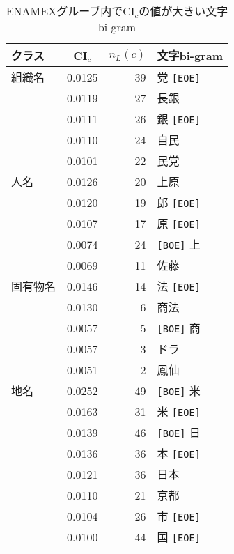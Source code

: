 \begin{table}[htbp]
\caption{\label{table:characters_with_CIc_bigram_enamex}ENAMEXグループ内でCI$_c$の値が大きい文字bi-gram}
\begin{center}
\begin{tabular}{|l|c|r|l|} \hline
クラス   & CI$_c$ & \(n_L(c)\) & 文字bi-gram \\ \hline \hline
組織名   & 0.0125 &   39 & 党 {\tt [EOE]}  \\ \cline{2-4} 
         & 0.0119 &   27 &            長銀 \\ \cline{2-4} 
         & 0.0111 &   26 & 銀 {\tt [EOE]}  \\ \cline{2-4} 
         & 0.0110 &   24 &            自民 \\ \cline{2-4} 
         & 0.0101 &   22 &            民党 \\ \hline \hline
人名     & 0.0126 &   20 &            上原 \\ \cline{2-4} 
         & 0.0120 &   19 & 郎 {\tt [EOE]}  \\ \cline{2-4} 
         & 0.0107 &   17 & 原 {\tt [EOE]}  \\ \cline{2-4} 
         & 0.0074 &   24 & {\tt [BOE]} 上  \\ \cline{2-4} 
         & 0.0069 &   11 &            佐藤 \\ \hline \hline
固有物名 & 0.0146 &   14 & 法 {\tt [EOE]}  \\ \cline{2-4} 
         & 0.0130 &    6 &            商法 \\ \cline{2-4} 
         & 0.0057 &    5 &  {\tt [BOE]} 商 \\ \cline{2-4} 
         & 0.0057 &    3 &            ドラ \\ \cline{2-4} 
         & 0.0051 &    2 &            鳳仙 \\ \hline \hline
地名     & 0.0252 &   49 &  {\tt [BOE]} 米 \\ \cline{2-4} 
         & 0.0163 &   31 & 米 {\tt [EOE]}  \\ \cline{2-4} 
         & 0.0139 &   46 &  {\tt [BOE]} 日 \\ \cline{2-4} 
         & 0.0136 &   36 & 本 {\tt [EOE]}  \\ \cline{2-4} 
         & 0.0121 &   36 &            日本 \\ \cline{2-4} 
         & 0.0110 &   21 &            京都 \\ \cline{2-4} 
         & 0.0104 &   26 & 市 {\tt [EOE]}  \\ \cline{2-4} 
         & 0.0100 &   44 & 国 {\tt [EOE]}  \\ \hline
\end{tabular}
\end{center}
\end{table}

